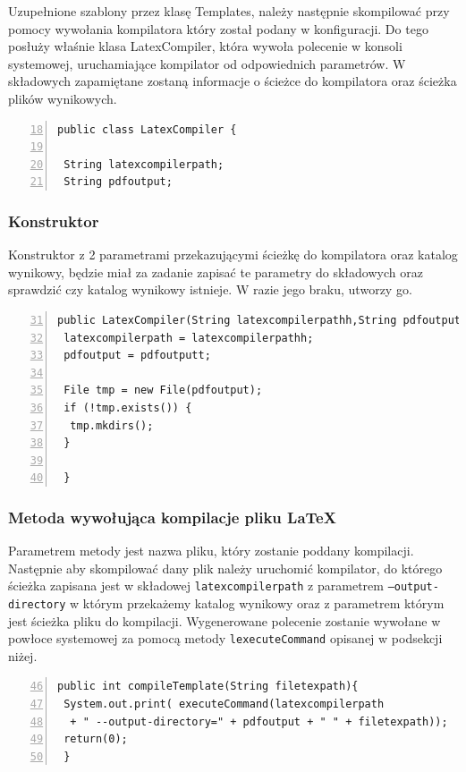 Uzupełnione szablony przez klasę Templates, należy następnie skompilować przy pomocy wywołania kompilatora który został podany w konfiguracji.
Do tego posłuży właśnie klasa LatexCompiler, która wywoła polecenie w konsoli systemowej, uruchamiające kompilator od odpowiednich parametrów.
W składowych zapamiętane zostaną informacje o ścieżce do kompilatora oraz ścieżka plików wynikowych.

 \begin{lstlisting}[numbers=left,firstnumber=18]
public class LatexCompiler {
    
 String latexcompilerpath;
 String pdfoutput;
\end{lstlisting}

\subsubsection*{Konstruktor}
Konstruktor z 2 parametrami przekazującymi ścieżkę do kompilatora oraz katalog wynikowy, będzie miał za zadanie zapisać te parametry do składowych oraz sprawdzić czy katalog wynikowy istnieje. W razie jego braku, utworzy go.

 \begin{lstlisting}[numbers=left,firstnumber=31]
public LatexCompiler(String latexcompilerpathh,String pdfoutputt){
 latexcompilerpath = latexcompilerpathh;
 pdfoutput = pdfoutputt;

 File tmp = new File(pdfoutput);
 if (!tmp.exists()) {
  tmp.mkdirs();
 }
    
 }
\end{lstlisting}

\subsubsection*{Metoda wywołująca kompilacje pliku LaTeX}

Parametrem metody jest nazwa pliku, który zostanie poddany kompilacji.  Następnie aby skompilować dany plik należy uruchomić kompilator, do którego ścieżka zapisana jest w składowej \texttt{latexcompilerpath} z parametrem \texttt{--output-directory} w którym przekażemy katalog wynikowy oraz z parametrem którym jest ścieżka pliku do kompilacji. Wygenerowane polecenie zostanie wywołane w powłoce systemowej za pomocą metody \texttt{lexecuteCommand} opisanej w podsekcji niżej.

 \begin{lstlisting}[numbers=left,firstnumber=46]
public int compileTemplate(String filetexpath){
 System.out.print( executeCommand(latexcompilerpath
  + " --output-directory=" + pdfoutput + " " + filetexpath));
 return(0);
 }
\end{lstlisting}

